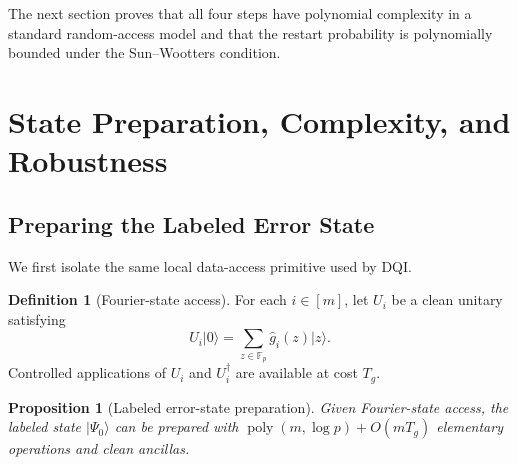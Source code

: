 \documentclass[11pt,letterpaper]{article}
\newtheorem{proposition}[theorem]{Proposition}
\theoremstyle{definition}
\newtheorem{definition}[theorem]{Definition}
\newcommand{\F}{\mathbb{F}}
\newcommand{\poly}{\operatorname{poly}}
\newcommand{\ket}[1]{\lvert #1\rangle}
\begin{document}
The next section proves that all four steps have polynomial complexity in a standard random-access model and that the restart probability is polynomially bounded under the Sun--Wootters condition.

\section{State Preparation, Complexity, and Robustness}

\subsection{Preparing the Labeled Error State}

We first isolate the same local data-access primitive used by DQI.

\begin{definition}[Fourier-state access]
For each $i\in[m]$, let $U_i$ be a clean unitary satisfying
\begin{equation}
   U_i\ket{0}=\sum_{z\in\F_p}\widehat g_i(z)\ket{z}.
   \label{eq:local-fourier-state}
\end{equation}
Controlled applications of $U_i$ and $U_i^\dagger$ are available at cost $T_g$.
\end{definition}

\begin{proposition}[Labeled error-state preparation]
\label{prop:shell-prep}
Given Fourier-state access, the labeled state $\ket{\Psi_0}$ can be prepared with
$\poly(m,\log p)+O(mT_g)$ elementary operations and clean ancillas.
\end{proposition}
\end{document}
